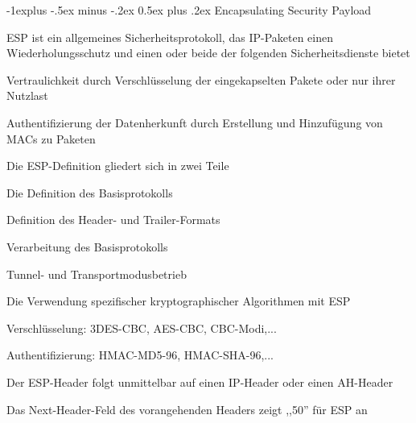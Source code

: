 \documentclass[a4paper]{article}
\makeatletter
\renewcommand{\subsection}{\@startsection{subsection}{2}{0mm}%
 {-1explus -.5ex minus -.2ex}%
 {0.5ex plus .2ex}%
 {\normalfont\normalsize\bfseries}}
\makeatother
\begin{document}
\begin{multicols}{3}
      \subsection{Encapsulating Security Payload}
      \begin{itemize*}
            \item ESP ist ein allgemeines Sicherheitsprotokoll, das IP-Paketen einen Wiederholungsschutz und einen oder beide der folgenden Sicherheitsdienste bietet
            \begin{itemize*}
                  \item Vertraulichkeit durch Verschlüsselung der eingekapselten Pakete oder nur ihrer Nutzlast
                  \item Authentifizierung der Datenherkunft durch Erstellung und Hinzufügung von MACs zu Paketen
            \end{itemize*}
            \item Die ESP-Definition gliedert sich in zwei Teile
            \begin{itemize*}
                  \item Die Definition des Basisprotokolls
                  \begin{itemize*}
                        \item Definition des Header- und Trailer-Formats
                        \item Verarbeitung des Basisprotokolls
                        \item Tunnel- und Transportmodusbetrieb
                  \end{itemize*}
                  \item Die Verwendung spezifischer kryptographischer Algorithmen mit ESP
                  \begin{itemize*}
                        \item Verschlüsselung: 3DES-CBC, AES-CBC, CBC-Modi,...
                        \item Authentifizierung: HMAC-MD5-96, HMAC-SHA-96,...
                  \end{itemize*}
            \end{itemize*}
            \item Der ESP-Header folgt unmittelbar auf einen IP-Header oder einen AH-Header
            \item Das Next-Header-Feld des vorangehenden Headers zeigt ,,50'' für ESP an

\end{itemize*}
\end{multicols}
\end{document}

